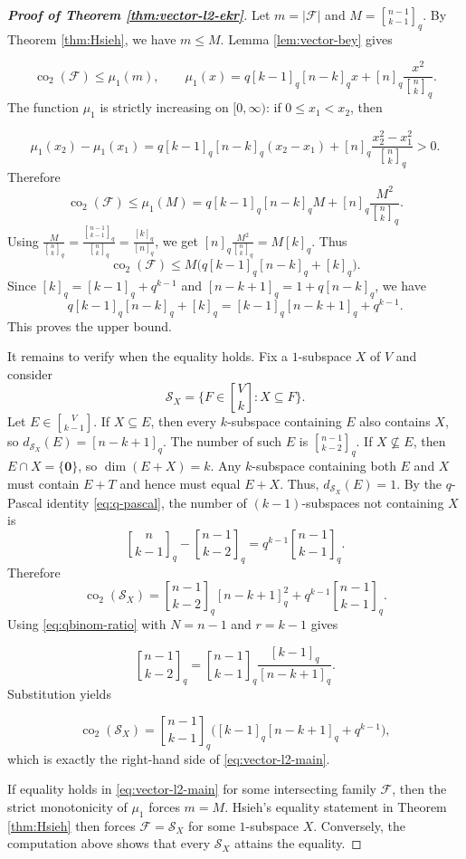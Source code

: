 \documentclass[11pt]{article}
\theoremstyle{definition}
\newcommand{\Gr}[2]{\genfrac{[}{]}{0pt}{}{#1}{#2}}
\newcommand{\qbinom}[2]{\genfrac{[}{]}{0pt}{}{#1}{#2}_q}
\newcommand{\co}{\operatorname{co}_2}
\begin{document}
\vskip 3mm
\begin{proof}[\bfseries{Proof of Theorem \ref{thm:vector-l2-ekr}}]
Let $m=|\mathcal F|$ and $M=\qbinom{n-1}{k-1}$. By Theorem \ref{thm:Hsieh}, we have $m\le M$.  Lemma \ref{lem:vector-bey} gives

\[
\co(\mathcal F)\le \mu_1(m),
\qquad
\mu_1(x)=q[k-1]_q[n-k]_qx+[n]_q\frac{x^2}{\qbinom{n}{k}}.
\]
The function $\mu_1$ is strictly increasing on $[0,\infty)$: if $0\le x_1<x_2$, then

\[
\mu_1(x_2)-\mu_1(x_1)=q[k-1]_q[n-k]_q(x_2-x_1)+[n]_q\frac{x_2^2-x_1^2}{\qbinom{n}{k}}>0.
\]
Therefore
\[
\co(\mathcal F)\le \mu_1(M)
=q[k-1]_q[n-k]_qM+[n]_q\frac{M^2}{\qbinom{n}{k}}.
\]
Using $\frac{M}{\qbinom{n}{k}}=\frac{\qbinom{n-1}{k-1}}{\qbinom{n}{k}}=\frac{[k]_q}{[n]_q}$, we get $[n]_q\frac{M^2}{\qbinom{n}{k}}=M[k]_q$. Thus
\[
\co(\mathcal F)
\le M\bigl(q[k-1]_q[n-k]_q+[k]_q\bigr).
\]
Since $[k]_q=[k-1]_q+q^{k-1}$ and $[n-k+1]_q=1+q[n-k]_q$, we have
\[
q[k-1]_q[n-k]_q+[k]_q
=[k-1]_q[n-k+1]_q+q^{k-1}.
\]
This proves the upper bound.

It remains to verify when the equality holds.  Fix a $1$-subspace $X$ of $V$ and consider
\[
\mathcal S_X=\{F\in\Gr{V}{k}:X\subseteq F\}.
\]
Let $E\in\Gr{V}{k-1}$.  If $X\subseteq E$, then every $k$-subspace containing $E$ also contains $X$, so $d_{\mathcal S_X}(E)=[n-k+1]_q$.
The number of such $E$ is $\qbinom{n-1}{k-2}$. If $X\not\subseteq E$, then $E\cap X=\{\bm{0}\}$, so $\dim(E+X)=k$.  Any $k$-subspace containing both $E$ and $X$ must contain $E+T$ and hence must equal $E+X$.  Thus, $d_{\mathcal S_X}(E)=1$. By the $q$-Pascal identity \eqref{eq:q-pascal}, the number of $(k-1)$-subspaces not containing $X$ is
\[
\qbinom{n}{k-1}-\qbinom{n-1}{k-2}=q^{k-1}\qbinom{n-1}{k-1}.
\]
Therefore
\[
\co(\mathcal S_X)
=\qbinom{n-1}{k-2}[n-k+1]_q^2
+q^{k-1}\qbinom{n-1}{k-1}.
\]
Using \eqref{eq:qbinom-ratio} with $N=n-1$ and $r=k-1$ gives

\[
\qbinom{n-1}{k-2}
=\qbinom{n-1}{k-1}\frac{[k-1]_q}{[n-k+1]_q}.
\]
Substitution yields

\[
\co(\mathcal S_X)
=\qbinom{n-1}{k-1}
\bigl([k-1]_q[n-k+1]_q+q^{k-1}\bigr),
\]
which is exactly the right-hand side of \eqref{eq:vector-l2-main}.

If equality holds in \eqref{eq:vector-l2-main} for some intersecting family $\mathcal F$, then the strict monotonicity of $\mu_1$ forces $m=M$.  Hsieh's equality statement in Theorem \ref{thm:Hsieh} then forces $\mathcal F=\mathcal S_X$ for some $1$-subspace $X$. Conversely, the computation above shows that every $\mathcal S_X$ attains the equality.
\end{proof}
\end{document}
